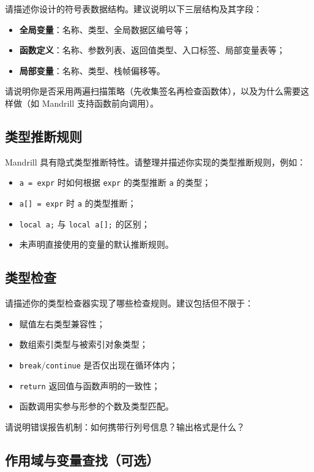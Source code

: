 \documentclass[12pt,hyperref,a4paper,UTF8]{ctexart}
\begin{document}
请描述你设计的符号表数据结构。建议说明以下三层结构及其字段：
\begin{itemize}
    \item \textbf{全局变量}：名称、类型、全局数据区编号等；
    \item \textbf{函数定义}：名称、参数列表、返回值类型、入口标签、局部变量表等；
    \item \textbf{局部变量}：名称、类型、栈帧偏移等。
\end{itemize}

请说明你是否采用两遍扫描策略（先收集签名再检查函数体），以及为什么需要这样做（如 Mandrill 支持函数前向调用）。

\subsection{类型推断规则}

Mandrill 具有隐式类型推断特性。请整理并描述你实现的类型推断规则，例如：
\begin{itemize}
    \item \texttt{a = expr} 时如何根据 \texttt{expr} 的类型推断 \texttt{a} 的类型；
    \item \texttt{a[] = expr} 时 \texttt{a} 的类型推断；
    \item \texttt{local a;} 与 \texttt{local a[];} 的区别；
    \item 未声明直接使用的变量的默认推断规则。
\end{itemize}

\subsection{类型检查}

请描述你的类型检查器实现了哪些检查规则。建议包括但不限于：
\begin{itemize}
    \item 赋值左右类型兼容性；
    \item 数组索引类型与被索引对象类型；
    \item \texttt{break}/\texttt{continue} 是否仅出现在循环体内；
    \item \texttt{return} 返回值与函数声明的一致性；
    \item 函数调用实参与形参的个数及类型匹配。
\end{itemize}

请说明错误报告机制：如何携带行列号信息？输出格式是什么？

\subsection{作用域与变量查找（可选）}
\end{document}
